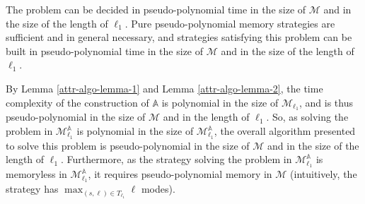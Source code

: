 \begin{theorem}
  The \SSPWE{} problem can be decided in pseudo-polynomial time in the size of $\mathcal{M}$ and in the size of the length of $\ell_1$.
  Pure pseudo-polynomial memory strategies are sufficient and in general necessary, and strategies satisfying this problem can be built in pseudo-polynomial time in the size of $\mathcal{M}$ and in the size of the length of $\ell_1$.
\end{theorem}

\begin{proof2}
By Lemma \ref{attr-algo-lemma-1} and Lemma \ref{attr-algo-lemma-2}, the time complexity of the construction of $\mathbb{A}$ is polynomial in the size of $\mathcal{M}_{\ell_1}$, and is thus pseudo-polynomial in the size of $\mathcal{M}$ and in the length of $\ell_1$.
So, as solving the \SSPE{} problem in $\mathcal{M}^\mathbb{A}_{\ell_1}$ is polynomial in the size of $\mathcal{M}^\mathbb{A}_{\ell_1}$,
the overall algorithm presented to solve this problem is pseudo-polynomial in the size of $\mathcal{M}$ and in the size of the length of $\ell_1$.
Furthermore, as the strategy solving the \SSPE{} problem in $\mathcal{M}_{\ell_1}^\mathbb{A}$ is memoryless in $\mathcal{M}_{\ell_1}^\mathbb{A}$, it requires pseudo-polynomial memory in $\mathcal{M}$ (intuitively, the strategy has $\max_{(s, \ell) \in T_{\ell_1}} \ell$ modes).

\end{proof2}

